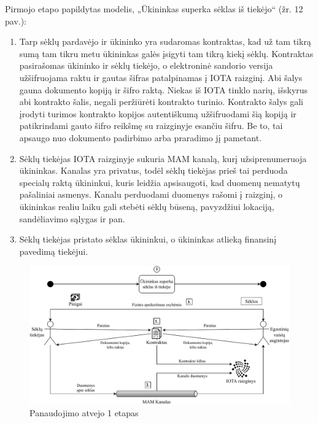 Pirmojo etapo papildytas modelis, „Ūkininkas superka sėklas iš tiekėjo“ (žr. 12 pav.):
\begin{enumerate}
    \item Tarp sėklų pardavėjo ir ūkininko yra sudaromas kontraktas, kad už tam tikrą sumą tam tikru metu ūkininkas galės įsigyti tam tikrą kiekį sėklų. Kontraktas pasirašomas ūkininko ir sėklų tiekėjo, o elektroninė sandorio versija užšifruojama raktu ir gautas šifras patalpinamas į IOTA raizginį. Abi šalys gauna dokumento kopiją ir šifro raktą. Niekas iš IOTA tinklo narių, išskyrus abi kontrakto šalis, negali peržiūrėti kontrakto turinio. Kontrakto šalys gali įrodyti turimos kontrakto kopijos autentiškumą užšifruodami šią kopiją ir patikrindami gauto šifro reikšmę su raizginyje esančiu šifru. Be to, tai apsaugo nuo dokumento padirbimo arba praradimo jį pametant. 
    \item Sėklų tiekėjas IOTA raizginyje sukuria MAM kanalą, kurį užsiprenumeruoja ūkininkas. Kanalas yra privatus, todėl sėklų tiekėjas prieš tai perduoda specialų raktą ūkininkui, kuris leidžia apsisaugoti, kad duomenų nematytų pašaliniai asmenys. Kanalu perduodami duomenys rašomi į raizginį, o ūkininkas realiu laiku gali stebėti sėklų būseną, pavyzdžiui lokaciją, sandėliavimo sąlygas ir pan.
    \item Sėklų tiekėjas pristato sėklas ūkininkui, o ūkininkas atlieką finansinį pavedimą tiekėjui.
\end{enumerate}

\begin{figure}[H]
    \centering
    \includegraphics[scale=0.7]{images/iota-usecase-1}
    \caption{Panaudojimo atvejo 1 etapas}
\end{figure}




